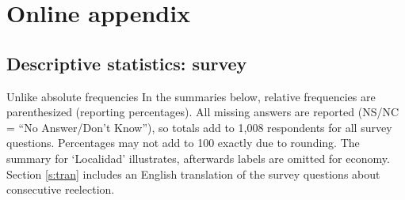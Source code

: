 \documentclass[letter,12pt]{article}
\begin{document}
\singlespacing




\newpage

\section{Online appendix}\label{appendix}

\subsection{Descriptive statistics: survey}

Unlike absolute frequencies In the summaries below, relative frequencies are parenthesized (reporting percentages). All missing answers are reported (NS/NC = ``No Answer/Don't Know''), so totals add to 1,008 respondents for all survey questions. Percentages may not add to 100 exactly due to rounding. The summary for `Localidad' illustrates, afterwards labels are omitted for economy. Section \ref{s:tran} includes an English translation of the survey questions about consecutive reelection. 
\end{document}
